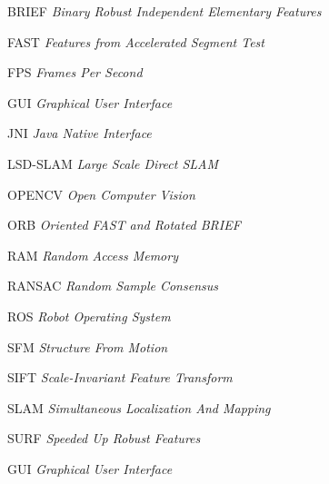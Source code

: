
\begin{siglas}
\item[BRIEF]\textit{Binary Robust Independent Elementary Features}
\item[FAST]\textit{Features from Accelerated Segment Test}
\item[FPS]\textit{Frames Per Second}
\item[GUI]\textit{Graphical User Interface}
\item[JNI]\textit{Java Native Interface}
\item[LSD-SLAM]\textit{Large Scale Direct SLAM} 
\item[OPENCV]\textit{Open Computer Vision}
\item[ORB]\textit{Oriented FAST and Rotated BRIEF}
\item[RAM]\textit{Random Access Memory}
\item[RANSAC]\textit{Random Sample Consensus}
\item[ROS]\textit{Robot Operating System}
\item[SFM]\textit{Structure From Motion}
\item[SIFT]\textit{Scale-Invariant Feature Transform}
\item[SLAM]\textit{Simultaneous Localization And Mapping}
\item[SURF]\textit{Speeded Up Robust Features}
\item[GUI]\textit{Graphical User Interface}

\end{siglas}

